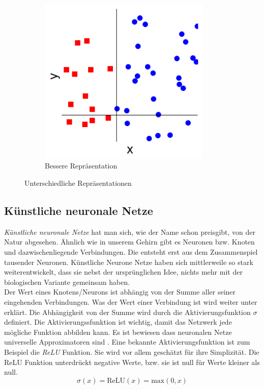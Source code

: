 \begin{figure}[hbt]
\begin{subfigure}{0.3\textwidth}
	\end{subfigure}
	\begin{subfigure}{0.3\textwidth}
		\includegraphics[width=0.9\textwidth]{assets/repr_2.png}
		\caption{Bessere Repräsentation}
	\end{subfigure}
	\caption{Unterschiedliche Repräsentationen}
	\label{img:repr}
\end{figure}

\subsection{Künstliche neuronale Netze}

\textit{Künstliche neuronale Netze} hat man sich, wie der Name schon preisgibt, von der Natur abgesehen. Ähnlich wie in unserem Gehirn gibt es Neuronen bzw. Knoten und dazwischenliegende Verbindungen. Die  entsteht erst aus dem Zusammenspiel tausender Neuronen. Künstliche Neurone Netze haben sich mittlerweile so stark weiterentwickelt, dass sie nebst der ursprünglichen Idee, nichts mehr mit der biologischen Variante gemeinsam haben. \\

Der Wert eines Knotens/Neurons ist abhängig von der Summe aller seiner eingehenden Verbindungen. Was der Wert einer Verbindung ist wird weiter unter erklärt. Die Abhängigkeit von der Summe wird durch die Aktivierungsfunktion $\sigma$ definiert. Die Aktivierungssfunktion ist wichtig, damit das Netzwerk jede mögliche Funktion abbilden kann. Es ist bewiesen dass neuronalen Netze universelle Approximatoren sind \parencite[][Kap. 4]{universal}. Eine bekannte Aktivierungsfunktion ist zum Beispiel die \textit{ReLU} Funktion. Sie wird vor allem geschätzt für ihre Simplizität. Die ReLU Funktion unterdrückt negative Werte, bzw. sie ist null für Werte kleiner als null. \parencite[vgl.][]{neuronale_netze}  \parencite[vgl.][]{chollet}
$$\sigma(x) = \text{ReLU}(x) = \text{max}(0, x)$$

